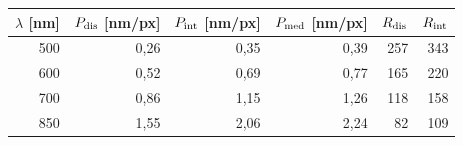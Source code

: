 \begin{tabular}{rrrrrr}
\toprule
$\lambda$ [nm] & $P_{\rm dis}$ [nm/px] & $P_{\rm int}$ [nm/px] & $P_{\rm med}$ [nm/px] & $R_{\rm dis}$ & $R_{\rm int}$ \\
\midrule
500 & 0{,}26 & 0{,}35 & 0{,}39 & 257 & 343 \\
600 & 0{,}52 & 0{,}69 & 0{,}77 & 165 & 220 \\
700 & 0{,}86 & 1{,}15 & 1{,}26 & 118 & 158 \\
850 & 1{,}55 & 2{,}06 & 2{,}24 & 82 & 109 \\
\bottomrule
\end{tabular}
